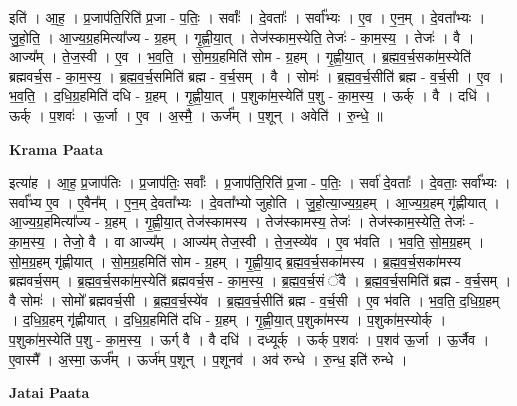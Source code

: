 \documentclass[17pt]{extarticle}
\begin{document}
इति॑ । आ॒ह॒ । प्र॒जाप॑ति॒रिति॑ प्र॒जा - प॒तिः॒ । सर्वाः᳚ । दे॒वताः᳚ । सर्वा᳚भ्यः । ए॒व । ए॒न॒म् । दे॒वता᳚भ्यः । जु॒हो॒ति॒ । आ॒ज्य॒ग्र॒हमित्या᳚ज्य - ग्र॒हम् । गृ॒ह्णी॒या॒त् । तेज॑स्काम॒स्येति॒ तेजः॑ - का॒म॒स्य॒ । तेजः॑ । वै । आज्य᳚म् । ते॒ज॒स्वी । ए॒व । भ॒व॒ति॒ । सो॒म॒ग्र॒हमिति॑ सोम - ग्र॒हम् । गृ॒ह्णी॒या॒त् । ब्र॒ह्म॒व॒र्च॒सका॑म॒स्येति॑ ब्रह्मवर्च॒स - का॒म॒स्य॒ । ब्र॒ह्म॒व॒र्च॒समिति॑ ब्रह्म - व॒र्च॒सम् । वै । सोमः॑ । ब्र॒ह्म॒व॒र्च॒सीति॑ ब्रह्म - व॒र्च॒सी । ए॒व । भ॒व॒ति॒ । द॒धि॒ग्र॒हमिति॑ दधि - ग्र॒हम् । गृ॒ह्णी॒या॒त् । प॒शुका॑म॒स्येति॑ प॒शु - का॒म॒स्य॒ । ऊर्क् । वै । दधि॑ । ऊर्क् । प॒शवः॑ । ऊ॒र्जा । ए॒व । अ॒स्मै॒ । ऊर्ज᳚म् । प॒शून् । अवेति॑ । रु॒न्धे॒ ॥  \newline


\textbf{Krama Paata} \newline

इत्या॑ह । आ॒ह॒ प्र॒जाप॑तिः । प्र॒जाप॑तिः॒ सर्वाः᳚ । प्र॒जाप॑ति॒रिति॑ प्र॒जा - प॒तिः॒ । सर्वा॑ दे॒वताः᳚ । दे॒वताः॒ सर्वा᳚भ्यः । सर्वा᳚भ्य ए॒व । ए॒वैन᳚म् । ए॒न॒म् दे॒वता᳚भ्यः । दे॒वता᳚भ्यो जुहोति । जु॒हो॒त्या॒ज्य॒ग्र॒हम् । आ॒ज्य॒ग्र॒हम् गृ॑ह्णीयात् । आ॒ज्य॒ग्र॒हमित्या᳚ज्य - ग्र॒हम् । गृ॒ह्णी॒या॒त् तेज॑स्कामस्य । तेज॑स्कामस्य॒ तेजः॑ । तेज॑स्काम॒स्येति॒ तेजः॑ - का॒म॒स्य॒ । तेजो॒ वै । वा आज्य᳚म् । आज्य॑म् तेज॒स्वी । ते॒ज॒स्व्ये॑व । ए॒व भ॑वति । भ॒व॒ति॒ सो॒म॒ग्र॒हम् । सो॒म॒ग्र॒हम् गृ॑ह्णीयात् । सो॒म॒ग्र॒हमिति॑ सोम - ग्र॒हम् । गृ॒ह्णी॒या॒द् ब्र॒ह्म॒व॒र्च॒सका॑मस्य । 
ब्र॒ह्म॒व॒र्च॒सका॑मस्य ब्रह्मवर्च॒सम् । ब्र॒ह्म॒व॒र्च॒सका॑म॒स्येति॑ ब्रह्मवर्च॒स - का॒म॒स्य॒ । ब्र॒ह्म॒व॒र्च॒सं ॅवै । ब्र॒ह्म॒व॒र्च॒समिति॑ ब्रह्म - व॒र्च॒सम् । वै सोमः॑ । सोमो᳚ ब्रह्मवर्च॒सी । ब्र॒ह्म॒व॒र्च॒स्ये॑व । ब्र॒ह्म॒व॒र्च॒सीति॑ ब्रह्म - व॒र्च॒सी । ए॒व भ॑वति । भ॒व॒ति॒ द॒धि॒ग्र॒हम् । द॒धि॒ग्र॒हम् गृ॑ह्णीयात् । द॒धि॒ग्र॒हमिति॑ दधि - ग्र॒हम् । गृ॒ह्णी॒या॒त् प॒शुका॑मस्य । प॒शुका॑म॒स्योर्क् । प॒शुका॑म॒स्येति॑ प॒शु - का॒म॒स्य॒ । ऊर्ग् वै । वै दधि॑ । दध्यूर्क् । ऊर्क् प॒शवः॑ । प॒शव॑ ऊ॒र्जा । ऊ॒र्जैव । ए॒वास्मै᳚ । अ॒स्मा॒ ऊर्ज᳚म् । ऊर्ज॑म् प॒शून् । प॒शूनव॑ । अव॑ रुन्धे । रु॒न्ध॒ इति॑ रुन्धे । \newline

\textbf{Jatai Paata} \newline
\end{document}
